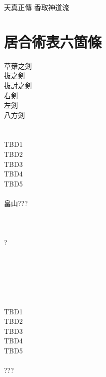 \documentclass[dvipdfmx, a4paper, 12pt]{utarticle}
\begin{document}
\begin{CJK*}{UTF8}{min}
\CJKtilde
\begin{landscape}

\newpage
\pagestyle{empty}
天真正傳
香取神道流
\section{居合術表六箇條}
\noindent 草薙之剣\\
抜之剣\\
抜討之剣\\
右剣\\
左剣\\
八方剣\\
\section{}
\noindent TBD1\\
TBD2\\
TBD3\\
TBD4\\
TBD5\\
\\
畠山???

\setcounter{section}{0}
\newpage
\pagestyle{empty}
\section{}
\noindent {}\\
?\\
\\
\\
\\
\\
\section{}
\noindent TBD1\\
TBD2\\
TBD3\\
TBD4\\
TBD5\\
\\
???


\end{landscape}
\end{CJK*}
\end{document}
